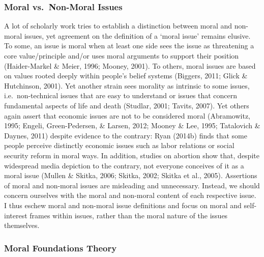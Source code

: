 \documentclass[12pt,econ]{sources/authesis}
\begin{document}
\hypertarget{framing-theory-morality-issues}{%
\subsubsection{Moral vs.~Non-Moral Issues}\label{framing-theory-morality-issues}}

A lot of scholarly work tries to establish a distinction between moral and non-moral issues, yet agreement on the definition of a `moral issue' remains elusive. To some, an issue is moral when at least one side sees the issue as threatening a core value/principle and/or uses moral arguments to support their position (Haider-Markel \& Meier, 1996; Mooney, 2001). To others, moral issues are based on values rooted deeply within people's belief systems (Biggers, 2011; Glick \& Hutchinson, 2001). Yet another strain sees morality as intrinsic to some issues, i.e.~non-technical issues that are easy to understand or issues that concern fundamental aspects of life and death (Studlar, 2001; Tavits, 2007). Yet others again assert that economic issues are not to be considered moral (Abramowitz, 1995; Engeli, Green-Pedersen, \& Larsen, 2012; Mooney \& Lee, 1995; Tatalovich \& Daynes, 2011) despite evidence to the contrary: Ryan (2014b) finds that some people perceive distinctly economic issues such as labor relations or social security reform in moral ways. In addition, studies on abortion show that, despite widespread media depiction to the contrary, not everyone conceives of it as a moral issue (Mullen \& Skitka, 2006; Skitka, 2002; Skitka et al., 2005). Assertions of moral and non-moral issues are misleading and unnecessary. Instead, we should concern ourselves with the moral and non-moral content of each respective issue. I thus eschew moral and non-moral issue definitions and focus on moral and self-interest frames within issues, rather than the moral nature of the issues themselves.

\hypertarget{framing-theory-morality-mft}{%
\subsubsection{Moral Foundations Theory}\label{framing-theory-morality-mft}}
\end{document}
